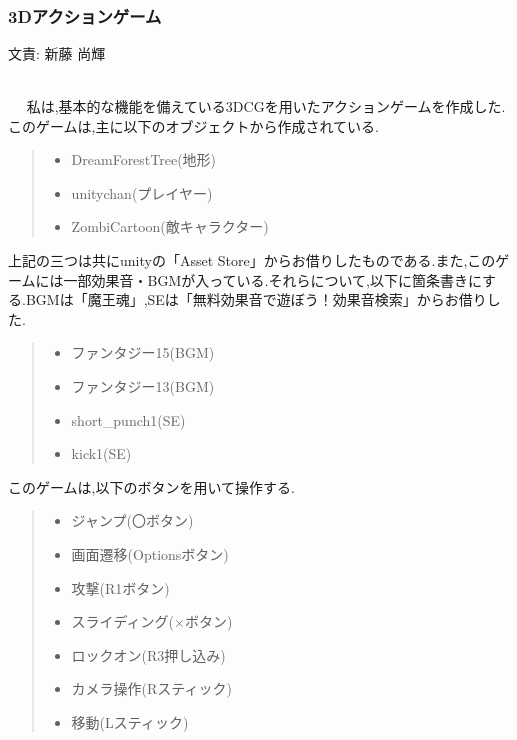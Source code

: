 \documentclass[a4paper]{jarticle}
\newcommand{\resp}[1]{\begin{flushright}文責: #1\end{flushright}~\\　}
\begin{document}
  　  　\subsubsection{3Dアクションゲーム}
        \resp{新藤 尚輝}
        私は,基本的な機能を備えている3DCGを用いたアクションゲームを作成した.\\
        このゲームは,主に以下のオブジェクトから作成されている.
        \begin{quote}
          \begin{itemize}
            \item DreamForestTree(地形)
            \item unitychan(プレイヤー)
            \item ZombiCartoon(敵キャラクター)
          \end{itemize}
        \end{quote}
        上記の三つは共にunityの「Asset Store」からお借りしたものである.また,このゲームには一部効果音・BGMが入っている.それらについて,以下に箇条書きにする.BGMは「魔王魂」,SEは「無料効果音で遊ぼう！効果音検索」からお借りした.\\
        \begin{quote}
          \begin{itemize}
            \item ファンタジー15(BGM)
            \item ファンタジー13(BGM)
            \item short\_punch1(SE)
            \item kick1(SE)
          \end{itemize}
        \end{quote}
        
        このゲームは,以下のボタンを用いて操作する.\\
        \begin{quote}
          \begin{itemize}
            \item ジャンプ(〇ボタン)
            \item 画面遷移(Optionsボタン)
            \item 攻撃(R1ボタン)
            \item スライディング(×ボタン)
            \item ロックオン(R3押し込み)
            \item カメラ操作(Rスティック)
            \item 移動(Lスティック)
          \end{itemize}
        \end{quote}
        
\end{document}
